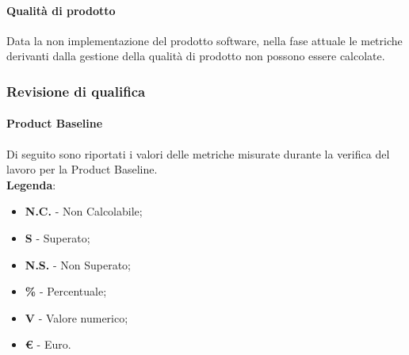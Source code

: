 	\paragraph{Qualità di prodotto}
	Data la non implementazione del prodotto software, nella fase attuale le metriche derivanti dalla gestione della qualità di prodotto non possono essere calcolate.
\newpage
	\subsubsection{Revisione di qualifica}
 		\paragraph{Product Baseline}
 		Di seguito sono riportati i valori delle metriche misurate durante la verifica del lavoro per la Product Baseline\glo.\\
\textbf{Legenda}:
 		\begin{itemize}
 			\item \textbf{N.C.} - Non Calcolabile;
 			\item \textbf{S} - Superato;
 			\item \textbf{N.S.} - Non Superato;
 			\item \textbf{\%} - Percentuale;
 			\item \textbf{V} - Valore numerico;
 			\item \textbf{\euro{}} - Euro.
 		\end{itemize}
 		
